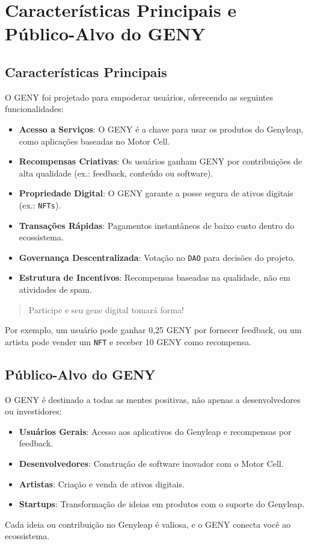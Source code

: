 \documentclass[a4paper,12pt,openany]{book}
\begin{document}
\section*{Características Principais e Público-Alvo do GENY}
\subsection*{Características Principais}
O GENY foi projetado para empoderar usuários, oferecendo as seguintes funcionalidades:
\begin{itemize}
    \item \textbf{Acesso a Serviços}: O GENY é a chave para usar os produtos do Genyleap, como aplicações baseadas no Motor Cell.
    \item \textbf{Recompensas Criativas}: Os usuários ganham GENY por contribuições de alta qualidade (ex.: feedback, conteúdo ou software).
    \item \textbf{Propriedade Digital}: O GENY garante a posse segura de ativos digitais (ex.: \texttt{NFTs}).
    \item \textbf{Transações Rápidas}: Pagamentos instantâneos de baixo custo dentro do ecossistema.
    \item \textbf{Governança Descentralizada}: Votação no \texttt{DAO} para decisões do projeto.
    \item \textbf{Estrutura de Incentivos}: Recompensas baseadas na qualidade, não em atividades de spam.
\end{itemize}
\begin{quote}
Participe e seu gene digital tomará forma!
\end{quote}
Por exemplo, um usuário pode ganhar 0,25 GENY por fornecer feedback, ou um artista pode vender um \texttt{NFT} e receber 10 GENY como recompensa.

\subsection*{Público-Alvo do GENY}
O GENY é destinado a todas as mentes positivas, não apenas a desenvolvedores ou investidores:
\begin{itemize}
    \item \textbf{Usuários Gerais}: Acesso aos aplicativos do Genyleap e recompensas por feedback.
    \item \textbf{Desenvolvedores}: Construção de software inovador com o Motor Cell.
    \item \textbf{Artistas}: Criação e venda de ativos digitais.
    \item \textbf{Startups}: Transformação de ideias em produtos com o suporte do Genyleap.
\end{itemize}
Cada ideia ou contribuição no Genyleap é valiosa, e o GENY conecta você ao ecossistema.
\newpage
\end{document}
